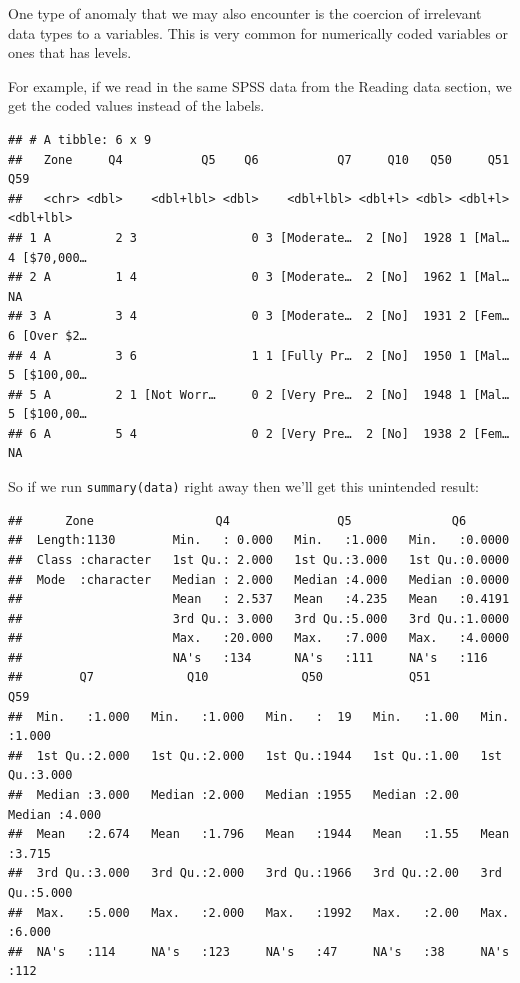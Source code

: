 \documentclass[
]{book}
\begin{document}
One type of anomaly that we may also encounter is the coercion of irrelevant data types to a variables. This is very common for numerically coded variables or ones that has levels.

For example, if we read in the same SPSS data from the Reading data section, we get the coded values instead of the labels.

\begin{verbatim}
## # A tibble: 6 x 9
##   Zone     Q4           Q5    Q6           Q7     Q10   Q50     Q51          Q59
##   <chr> <dbl>    <dbl+lbl> <dbl>    <dbl+lbl> <dbl+l> <dbl> <dbl+l>    <dbl+lbl>
## 1 A         2 3                0 3 [Moderate…  2 [No]  1928 1 [Mal…  4 [$70,000…
## 2 A         1 4                0 3 [Moderate…  2 [No]  1962 1 [Mal… NA          
## 3 A         3 4                0 3 [Moderate…  2 [No]  1931 2 [Fem…  6 [Over $2…
## 4 A         3 6                1 1 [Fully Pr…  2 [No]  1950 1 [Mal…  5 [$100,00…
## 5 A         2 1 [Not Worr…     0 2 [Very Pre…  2 [No]  1948 1 [Mal…  5 [$100,00…
## 6 A         5 4                0 2 [Very Pre…  2 [No]  1938 2 [Fem… NA
\end{verbatim}

So if we run \texttt{summary(data)} right away then we'll get this unintended result:

\begin{verbatim}
##      Zone                 Q4               Q5              Q6        
##  Length:1130        Min.   : 0.000   Min.   :1.000   Min.   :0.0000  
##  Class :character   1st Qu.: 2.000   1st Qu.:3.000   1st Qu.:0.0000  
##  Mode  :character   Median : 2.000   Median :4.000   Median :0.0000  
##                     Mean   : 2.537   Mean   :4.235   Mean   :0.4191  
##                     3rd Qu.: 3.000   3rd Qu.:5.000   3rd Qu.:1.0000  
##                     Max.   :20.000   Max.   :7.000   Max.   :4.0000  
##                     NA's   :134      NA's   :111     NA's   :116     
##        Q7             Q10             Q50            Q51            Q59       
##  Min.   :1.000   Min.   :1.000   Min.   :  19   Min.   :1.00   Min.   :1.000  
##  1st Qu.:2.000   1st Qu.:2.000   1st Qu.:1944   1st Qu.:1.00   1st Qu.:3.000  
##  Median :3.000   Median :2.000   Median :1955   Median :2.00   Median :4.000  
##  Mean   :2.674   Mean   :1.796   Mean   :1944   Mean   :1.55   Mean   :3.715  
##  3rd Qu.:3.000   3rd Qu.:2.000   3rd Qu.:1966   3rd Qu.:2.00   3rd Qu.:5.000  
##  Max.   :5.000   Max.   :2.000   Max.   :1992   Max.   :2.00   Max.   :6.000  
##  NA's   :114     NA's   :123     NA's   :47     NA's   :38     NA's   :112
\end{verbatim}
\end{document}
